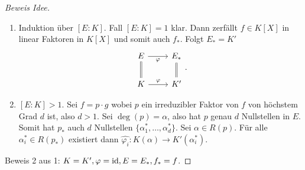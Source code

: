 \begin{proof}[Beweis Idee]
	\begin{enumerate}[(1)]
		\item Induktion über $[E:K]$. Fall $[E:K] = 1$ klar.
			Dann zerfällt $f \in K[X]$ in linear Faktoren in $K[X]$ und somit auch $f_{*}$.
			Folgt $E_{*} = K'$	
			\[
				\begin{tikzcd}
					E \arrow[r, "\varphi"']                               & E_*                               \\
					K \arrow[r, "\varphi"] \arrow[u, equal] & K' \arrow[u,equal]
				\end{tikzcd}
			.\] 	
		\item $[E:K] > 1$. Sei $f = p \cdot g$ wobei $p$ ein irreduzibler Faktor von $f$ von höchstem Grad $d$ ist, also  $d > 1$.
			Sei $\deg(p) = \alpha$, also hat $p$ genau $d$ Nullstellen in $E$.
			Somit hat  $p_{*}$ auch $d$ Nullstellen $\{\alpha_1^{*},\ldots, \alpha_{d}^{*}\}$.
			Sei $\alpha \in R(p)$. Für alle $\alpha_{i}^{*} \in R(p_{*})$ existiert dann $\widehat{\varphi_{i}}: K(\alpha) \to K'(\alpha_{i}^{*})$.
	\end{enumerate}
	Beweis 2 aus 1: $K = K', \varphi = \operatorname{id}, E = E_{*}, f_{*} = f$.
\end{proof}

























